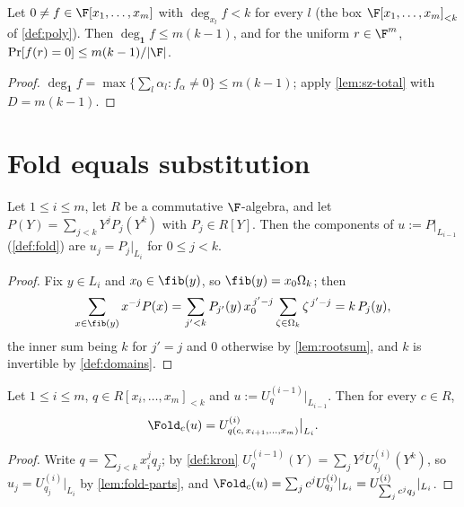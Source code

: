 \begin{corollary}\label{cor:box}
Let $0\ne f\in\F[x_1,\dots,x_m]$ with $\deg_{x_l}f<k$ for every $l$ (the box
$\F[x_1,\dots,x_m]_{<k}$ of \ref{def:poly}). Then $\deg_{\mathbf 1}f\le m(k-1)$, and for the
uniform $r\in\F^m$, $\Pr[f(r)=0]\le m(k-1)/|\F|$.
\end{corollary}

\begin{proof}
$\deg_{\mathbf 1}f=\max\{\sum_l\alpha_l:f_\alpha\ne0\}\le m(k-1)$; apply \ref{lem:sz-total} with
$D=m(k-1)$.
\end{proof}

\section{Fold equals substitution}

\begin{lemma}\label{lem:fold-parts}
Let $1\le i\le m$, let $R$ be a commutative $\F$-algebra, and let
$P(Y)=\sum_{j<k}Y^jP_j(Y^k)$ with $P_j\in R[Y]$. Then the components of $u:=P|_{L_{i-1}}$
(\ref{def:fold}) are $u_j=P_j|_{L_i}$ for $0\le j<k$.
\end{lemma}

\begin{proof}
Fix $y\in L_i$ and $x_0\in\fib(y)$, so $\fib(y)=x_0\Omega_k$; then
\[
\sum_{x\in\fib(y)}x^{-j}P(x)=\sum_{j'<k}P_{j'}(y)\,x_0^{\,j'-j}\sum_{\zeta\in\Omega_k}
\zeta^{\,j'-j}=k\,P_j(y),
\]
the inner sum being $k$ for $j'=j$ and $0$ otherwise by \ref{lem:rootsum}, and $k$ is invertible by
\ref{def:domains}.
\end{proof}

\begin{lemma}\label{lem:fold-sub}
Let $1\le i\le m$, $q\in R[x_i,\dots,x_m]_{<k}$ and $u:=U^{(i-1)}_q|_{L_{i-1}}$. Then for every
$c\in R$,
\[
\Fold_c(u)=U^{(i)}_{q(c,\,x_{i+1},\dots,x_m)}\big|_{L_i}.
\]
\end{lemma}

\begin{proof}
Write $q=\sum_{j<k}x_i^jq_j$; by \ref{def:kron} $U^{(i-1)}_q(Y)=\sum_jY^jU^{(i)}_{q_j}(Y^k)$, so
$u_j=U^{(i)}_{q_j}|_{L_i}$ by \ref{lem:fold-parts}, and
$\Fold_c(u)=\sum_jc^jU^{(i)}_{q_j}|_{L_i}=U^{(i)}_{\sum_jc^jq_j}|_{L_i}$.
\end{proof}


